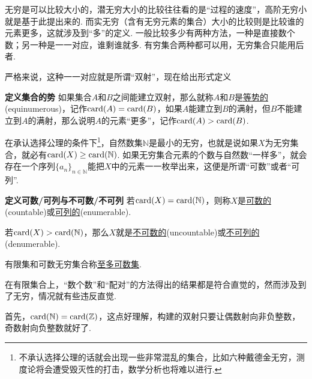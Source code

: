\documentclass[UTF8]{ctexart}
\newcommand{\trm}[1]{{\rm #1}}
\newenvironment{definition}[1]
    {\begin{tcolorbox}[enhanced, colback=LightYellow, breakable=false, frame hidden, borderline west={1.5mm}{-2mm}{DarkGreen}]
    {\bfseries {\color{DarkGreen} 定义}\quad #1} \newline}
    {\end{tcolorbox}}
\begin{document}
无穷是可以比较大小的，潜无穷大小的比较往往看的是“过程的速度”，高阶无穷小就是基于此提出来的. 而实无穷（含有无穷元素的集合）大小的比较则是比较谁的元素更多，这就涉及到“多”的定义. 一般比较多少有两种方法，一种是直接数个数；另一种是一一对应，谁剩谁就多. 有穷集合两种都可以用，无穷集合只能用后者.

严格来说，这种一一对应就是所谓“双射”，现在给出形式定义
\begin{definition}{集合的势}
    如果集合\(A\)和\(B\)之间能建立双射，那么就称\(A\)和\(B\)是\uline{等势的}(equinumerous)，记作\(\trm{card}(A)=\trm{card}(B)\)，如果\(A\)能建立到\(B\)的满射，但\(B\)不能建立到\(A\)的满射，那么说明\(A\)的元素“更多”，记作\(\trm{card}(A)>\trm{card}(B)\).
\end{definition}

在承认选择公理的条件下\footnote{不承认选择公理的话就会出现一些非常混乱的集合，比如六种戴德金无穷，测度论将会遭受毁灭性的打击，数学分析也将难以进行.}，自然数集\(\mathbb{N}\)是最小的无穷，也就是说如果\(X\)为无穷集合，就必有\(\trm{card}(X)\geq\trm{card}(\mathbb{N})\). 如果无穷集合元素的个数与自然数“一样多”，就会存在一个序列\(\{a_n\}_{n\in\mathbb{N}}\)能把\(X\)中的元素一一枚举出来，这便是所谓“可数”或者“可列”.

\begin{definition}{可数/可列与不可数/不可列}
    若\(\trm{card}(X)=\trm{card}(\mathbb{N})\)，则称\(X\)是\uline{可数的}(countable)或\uline{可列的}(enumerable). 
    \par
    若\(\trm{card}(X)>\trm{card}(\mathbb{N})\)，那么\(X\)就是\uline{不可数的}(uncountable)或\uline{不可列的}(denumerable).
    \par
    有限集和可数无穷集合称\uline{至多可数集}.
\end{definition}

在有限集合上，“数个数”和“配对”的方法得出的结果都是符合直觉的，然而涉及到了无穷，情况就有些违反直觉.

首先，\(\trm{card}(\mathbb{N})=\trm{card}(\mathbb{Z})\)，这点好理解，构建的双射只要让偶数射向非负整数，奇数射向负整数就好了.
\end{document}
